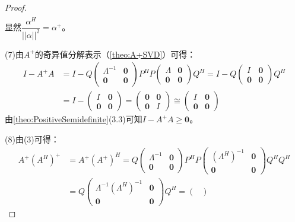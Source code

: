 \begin{proof}
\begin{gather*}
	\end{gather*}
	显然$\dfrac{\alpha^H}{||\alpha||^2}=\alpha^+$。\par
	(7)由$A^+$的奇异值分解表示（\cref{theo:A+SVD}）可得：
	\begin{align*}
		I-A^+A&=I-Q
		\begin{pmatrix}
			\varLambda^{-1} & \mathbf{0} \\
			\mathbf{0} & \mathbf{0}
		\end{pmatrix}
		P^HP
		\begin{pmatrix}
			\varLambda & \mathbf{0} \\
			\mathbf{0} & \mathbf{0}
		\end{pmatrix}Q^H
		=I-Q
		\begin{pmatrix}
			I & \mathbf{0} \\
			\mathbf{0} & \mathbf{0}
		\end{pmatrix}Q^H \\
		&=I-\begin{pmatrix}
			I & \mathbf{0} \\
			\mathbf{0} & \mathbf{0}
		\end{pmatrix}
		=\begin{pmatrix}
			\mathbf{0} & \mathbf{0} \\
			\mathbf{0} & I
		\end{pmatrix}\cong
		\begin{pmatrix}
			I & \mathbf{0} \\
			\mathbf{0} & \mathbf{0}
		\end{pmatrix}
	\end{align*}
	由\cref{theo:PositiveSemidefinite}(3.3)可知$I-A^+A\geqslant\mathbf{0}$。\par
	(8)由(3)可得：
	\begin{align*}
		A^+(A^H)^+&=A^+(A^+)^H=Q
		\begin{pmatrix}
			\varLambda^{-1} & \mathbf{0} \\
			\mathbf{0} & \mathbf{0}
		\end{pmatrix}
		P^HP
		\begin{pmatrix}
			(\varLambda^H)^{-1} & \mathbf{0} \\
			\mathbf{0} & \mathbf{0}
		\end{pmatrix}Q^HQ^H \\
		&=Q\begin{pmatrix}
			\varLambda^{-1}(\varLambda^H)^{-1} & \mathbf{0} \\
			\mathbf{0} & \mathbf{0}
		\end{pmatrix}Q^H
		=\begin{pmatrix}

\end{pmatrix}
\end{align*}
\end{proof}

